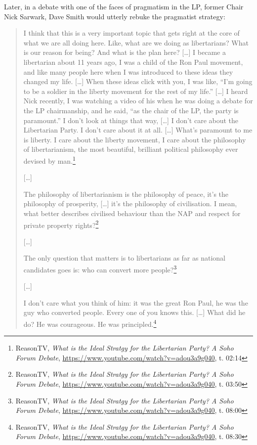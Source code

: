 \documentclass[11pt]{article}
\begin{document}
Later, in a debate with one of the faces of pragmatism in the LP, former Chair Nick Sarwark, Dave Smith would utterly rebuke the pragmatist strategy:
\begin{quote}
I think that this is a very important topic that gets right at the core of what we are all doing here. Like, what are we doing as libertarians? What is our reason for being? And what is the plan here? [\ldots{}] I became a libertarian about 11 years ago, I was a child of the Ron Paul movement, and like many people here when I was introduced to these ideas they changed my life. [\ldots{}] When these ideas click with you, I was like, ``I'm going to be a soldier in the liberty movement for the rest of my life.'' [\ldots{}] I heard Nick recently, I was watching a video of his when he was doing a debate for the LP chairmanship, and he said, ``as the chair of the LP, the party is paramount.'' I don't look at things that way, [\ldots{}] I don't care about the Libertarian Party. I don't care about it at all. [\ldots{}] What's paramount to me is liberty. I care about the liberty movement, I care about the philosophy of libertarianism, the most beautiful, brilliant political philosophy ever devised by man.\footnote{ReasonTV, \emph{What is the Ideal Stratgy for the Libertarian Party? A Soho Forum Debate}, \url{https://www.youtube.com/watch?v=adou3a9g040}, t. 02:14}

{[}\ldots{}]

The philosophy of libertarianism is the philosophy of peace, it's the philosophy of prosperity, [\ldots{}] it's the philosophy of civilisation. I mean, what better describes civilised behaviour than the NAP and respect for private property rights?\footnote{ReasonTV, \emph{What is the Ideal Stratgy for the Libertarian Party? A Soho Forum Debate}, \url{https://www.youtube.com/watch?v=adou3a9g040}, t. 03:50}

{[}\ldots{}]

The only question that matters is to libertarians as far as national candidates goes is: who can convert more people?\footnote{ReasonTV, \emph{What is the Ideal Stratgy for the Libertarian Party? A Soho Forum Debate}, \url{https://www.youtube.com/watch?v=adou3a9g040}, t. 08:00}

{[}\ldots{}]

I don't care what you think of him: it was the great Ron Paul, he was the guy who converted people. Every one of you knows this. [\ldots{}] What did he do? He was courageous. He was principled.\footnote{ReasonTV, \emph{What is the Ideal Stratgy for the Libertarian Party? A Soho Forum Debate}, \url{https://www.youtube.com/watch?v=adou3a9g040}, t. 08:30}
\end{quote}
\end{document}
